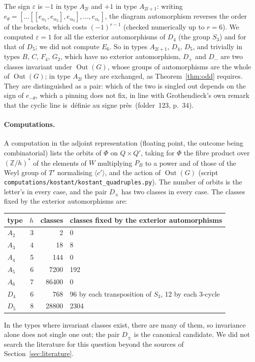 \documentclass[11pt,a4paper]{amsart}
\theoremstyle{definition}
\theoremstyle{remark}
\newcommand{\q}[1]{\guillemotleft\,#1\,\guillemotright}
\begin{document}
The sign $\varepsilon$ is $-1$ in type $A_{2l}$ and $+1$ in type $A_{2l+1}$: writing $e_\theta = [\dots[[e_{\alpha_1}, e_{\alpha_2}], e_{\alpha_3}], \dots, e_{\alpha_r}]$, the diagram automorphism reverses the order of the brackets, which costs $(-1)^{r-1}$ (checked numerically up to $r = 6$). We computed $\varepsilon = 1$ for all the exterior automorphisms of $D_4$ (the group $S_3$) and for that of $D_5$; we did not compute $E_6$. So in types $A_{2l+1}$, $D_4$, $D_5$, and trivially in types $B$, $C$, $F_4$, $G_2$, which have no exterior automorphism, $D_+$ and $D_-$ are two classes invariant under $\operatorname{Out}(G)$, whose groups of automorphisms are the whole of $\operatorname{Out}(G)$; in type $A_{2l}$ they are exchanged, as Theorem~\ref{thm:odd} requires. They are distinguished as a pair: which of the two is singled out depends on the sign of $e_{-\theta}$, which a pinning does not fix, in line with Grothendieck's own remark that the cyclic line is \q{définie au signe près} (folder~123, p.~34).

\paragraph{Computations.} A computation in the adjoint representation (floating point, the outcome being combinatorial) lists the orbits of $\Phi$ on $Q\times Q'$, taking for $\Phi$ the fibre product over $(\mathbb Z/h)^*$ of the elements of $W$ multiplying $P_B$ to a power and of those of the Weyl group of $T'$ normalising $\langle c'\rangle$, and the action of $\operatorname{Out}(G)$ (script \texttt{computations/kostant/kostant\_quadruples.py}). The number of orbits is the letter's in every case, and the pair $D_\pm$ has two classes in every case. The classes fixed by the exterior automorphisms are:
\begin{center}\small
\begin{tabular}{lrrl}
type & $h$ & classes & classes fixed by the exterior automorphisms\\
\hline
$A_2$ & 3 & 2 & 0\\
$A_3$ & 4 & 18 & 8\\
$A_4$ & 5 & 144 & 0\\
$A_5$ & 6 & 7200 & 192\\
$A_6$ & 7 & 86400 & 0\\
$D_4$ & 6 & 768 & 96 by each transposition of $S_3$, 12 by each $3$-cycle\\
$D_5$ & 8 & 28800 & 2304\\
\end{tabular}
\end{center}
In the types where invariant classes exist, there are many of them, so invariance alone does not single one out; the pair $D_\pm$ is the canonical candidate. We did not search the literature for this question beyond the sources of Section~\ref{sec:literature}.
\end{document}
